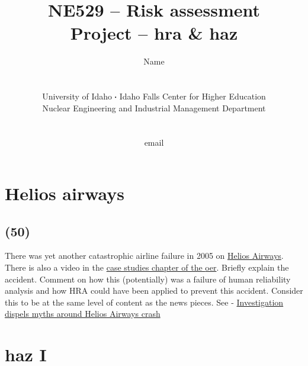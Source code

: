 \documentclass[11pt,a4paper]{article}
\newcommand*\sq{\mathbin{\vcenter{\hbox{\rule{.3ex}{.3ex}}}}} %
\newcommand{\acs}{\acrshort} %
\begin{document}
\begin{titlepage}
    \title{
        NE529 -- Risk assessment\\
        Project  -- \acs{hra} \& \acs{haz}\\
    }
    \author{
        Name
        \\ \\ \\
        University of Idaho $\sq$ Idaho Falls Center for Higher Education\\
        Nuclear Engineering and Industrial Management Department
        \\ \\ \\
        email 
    }
\clearpage %
\maketitle
\vspace*{\fill}
\thispagestyle{empty} %
\end{titlepage}


\section{Helios airways}
\subsection*{(50)}
There was yet another catastrophic airline failure in 2005 on \href{https://en.wikipedia.org/wiki/Helios_Airways_Flight_522}{Helios Airways}. There is also a video in the \href{https://courses.lumenlearning.com/uidaho-riskassessment/chapter/contemporary-cases-in-risk-assessment-2/}{case studies chapter of the \acs{oer}}. Briefly explain the accident. Comment on how this (potentially) was a failure of human reliability analysis and how HRA could have been applied to prevent this accident. Consider this to be at the same level of content as the news pieces. See - \href{https://www.flightglobal.com/news/articles/investigation-dispels-myths-around-helios-airways-cr-209984/}{Investigation dispels myths around Helios Airways crash}





\newpage

\section{\acs{haz} I}
\end{document}

